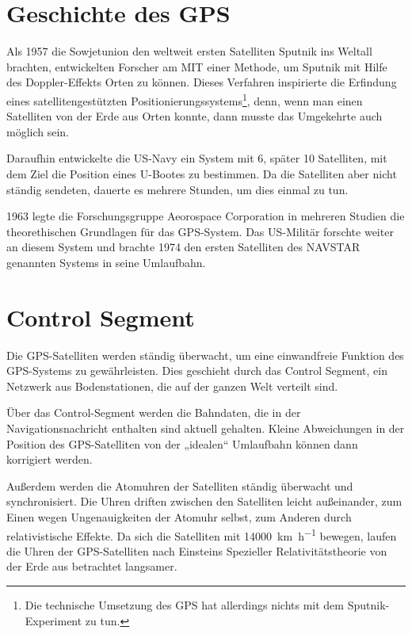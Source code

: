 \documentclass[12pt,a4paper]{scrartcl}
\begin{document}
\section{Geschichte des GPS}
\label{sec:history}
Als 1957 die Sowjetunion den weltweit ersten Satelliten Sputnik ins Weltall brachten, entwickelten Forscher am MIT einer Methode, um Sputnik mit Hilfe des Doppler-Effekts Orten zu können. Dieses Verfahren inspirierte die Erfindung eines satellitengestützten Positionierungssystems\footnote{Die technische Umsetzung des GPS hat allerdings nichts mit dem Sputnik-Experiment zu tun.}, denn, wenn man einen Satelliten von der Erde aus Orten konnte, dann musste das Umgekehrte auch möglich sein.\cite{tomtom_history}

Daraufhin entwickelte die US-Navy ein System mit 6, später 10 Satelliten, mit dem Ziel die Position eines U-Bootes zu bestimmen. Da die Satelliten aber nicht ständig sendeten, dauerte es mehrere Stunden, um dies einmal zu tun.\cite{techhive_history}

1963 legte die Forschungsgruppe Aeorospace Corporation in mehreren Studien die theorethischen Grundlagen für das GPS-System. Das US-Militär forschte weiter an diesem System und brachte 1974 den ersten Satelliten des NAVSTAR genannten Systems in seine Umlaufbahn.

\section{Control Segment}
\label{sec:control}

Die GPS-Satelliten werden ständig überwacht, um eine einwandfreie Funktion des GPS-Systems zu gewährleisten. Dies geschieht durch das Control Segment, ein Netzwerk aus Bodenstationen, die auf der ganzen Welt verteilt sind.

Über das Control-Segment werden die Bahndaten, die in der Navigationsnachricht enthalten sind aktuell gehalten. Kleine Abweichungen in der Position des GPS-Satelliten von der „idealen“ Umlaufbahn können dann korrigiert werden.

Außerdem werden die Atomuhren der Satelliten ständig überwacht und synchronisiert. Die Uhren driften zwischen den Satelliten leicht außeinander, zum Einen wegen Ungenauigkeiten der Atomuhr selbst, zum Anderen durch relativistische Effekte.
Da sich die Satelliten mit \SI{14000}{\kilo\meter\per\hour} bewegen, laufen die Uhren der GPS-Satelliten nach Einsteins Spezieller Relativitätstheorie von der Erde aus betrachtet langsamer. 
\end{document}
